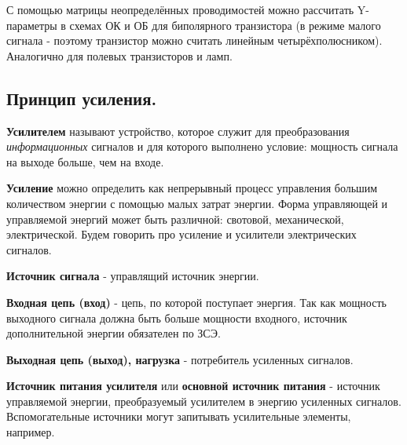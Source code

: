 \documentclass[a4paper,12pt]{report}
\begin{document}
С помощью матрицы неопределённых проводимостей можно рассчитать Y-параметры в схемах ОК и ОБ для биполярного транзистора (в режиме малого сигнала - поэтому транзистор можно считать линейным четырёхполюсником). Аналогично для полевых транзисторов и ламп.

\subsection{Принцип усиления.}


\textbf{Усилителем} называют устройство, которое служит для преобразования \textit{информационных} сигналов и для которого выполнено условие: мощность сигнала на выходе больше, чем на входе.

\textbf{Усиление} можно определить как непрерывный процесс управления большим количеством энергии с помощью малых затрат энергии. Форма управляющей и управляемой энергий может быть различной: свотовой, механической, электрической. Будем говорить про усиление и усилители электрических сигналов. 

\textbf{Источник сигнала} - управлящий источник энергии.

\textbf{Входная цепь (вход)} - цепь, по которой поступает энергия. Так как мощность выходного сигнала должна быть больше мощности входного, источник дополнительной энергии обязателен по ЗСЭ.

\textbf{Выходная цепь (выход), нагрузка} - потребитель усиленных сигналов.

\textbf{Источник питания усилителя} или \textbf{основной источник питания} - источник управляемой энергии, преобразуемый усилителем в энергию усиленных сигналов. Вспомогательные источники могут запитывать усилительные элементы, например.
\end{document}
